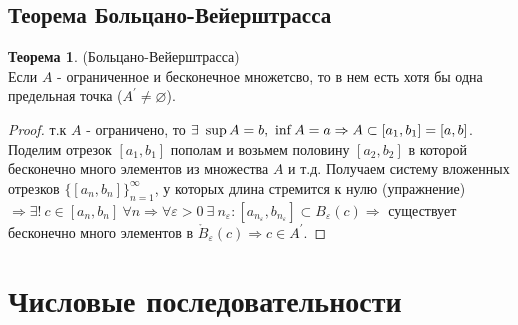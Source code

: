 \documentclass[a4paper, 12pt]{article}
\renewcommand{\epsilon}{\varepsilon}
\renewcommand{\emptyset}{\varnothing}
\theoremstyle{definition}
\newtheorem*{theorem}{Теорема}
\begin{document}
    \subsection{Теорема Больцано-Вейерштрасса}
        \begin{theorem} (Больцано-Вейерштрасса)\\
            Если $A$ - ограниченное и бесконечное множетсво, то в нем есть хотя бы одна предельная точка ($A^{\prime}\ne \emptyset$).
        \end{theorem} 
        \begin{proof}
            т.к $A$ - ограничено, то $\exists\ \sup{A}=b,\ \inf{A}=a\\ \Rightarrow A\subset [a_1,b_1] = [a,b]$. Поделим отрезок $[a_1,b_1]$ пополам и возьмем половину $[a_2,b_2]$ в которой бесконечно много элементов из множества $A$ и т.д. Получаем систему вложенных отрезков $\{[a_n,b_n]\}_{n=1}^{\infty}$, у которых длина стремится к нулю (упражнение) $\Rightarrow \exists!\ c\in [a_n,b_n]\ \forall n\Rightarrow \forall \epsilon>0\ \exists\ n_{\epsilon}: [a_{n_{\epsilon}},b_{n_{\epsilon}}]\subset B_{\epsilon}(c) \Rightarrow$ существует бесконечно много элементов в $\mathring{B}_{\epsilon}(c)\Rightarrow c\in A^{\prime}$.
        \end{proof}
    \newpage
    \section{Числовые последовательности}
\end{document}
